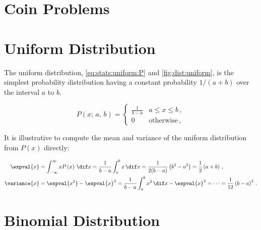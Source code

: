 \section{Coin Problems}
\label{stats:coin_problems}

\section{Uniform Distribution}
\label{stats:uniform}

The uniform distribution, \cref{eq:stats:uniform:P} and \cref{fig:dist:uniform},
is the simplest probability distribution
having a constant probability $1/(a+b)$ over the interval $a$ to $b$.

\begin{equation}\label{eq:stats:uniform:P}
P\left(x;\,a,\,b\right) = \begin{cases}
\frac{1}{b-a} & a \leq x \leq b \,, \\
0 & \text{otherwise} \,,
\end{cases}
\end{equation}

It is illustrative to compute the mean and variance of the uniform distribution from $P(x)$ directly:

\begin{subequations}\label{eq:stats:uniform:mean_variance}
\begin{align}
\expval{x} &= \int_{-\infty}^{\infty} x P\left(x\right) \, \dif x = \frac{1}{b-a} \int_{a}^{b} x \, \dif x = \frac{1}{2(b-a)}\left(b^{2} - a^{2}\right) = \frac{1}{2}\left(a + b\right)\,, \label{eq:stats:uniform:mean_variance:mean} \\
\variance{x} &= \expval{x^{2}} - \expval{x}^{2} = \frac{1}{b-a} \int_{a}^{b} x^{2} \, \dif x - \expval{x}^{2} = \cdots = \frac{1}{12}\left(b-a\right)^{2}\,. \label{eq:stats:uniform:mean_variance:variance}
\end{align}
\end{subequations}

\section{Binomial Distribution}
\label{stats:binomial}

